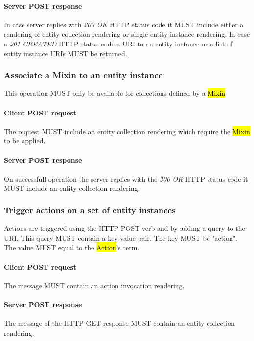 \documentclass[10pt,a4paper]{article}
\begin{document}
\paragraph{Server POST response}
In case server replies with \emph{200 OK} HTTP status code it MUST include either a rendering of entity collection rendering or single entity instance rendering. In case a \emph{201 CREATED} HTTP status code a URI to an entity instance or a list of entity instance URIs MUST be returned.

\subsubsection{Associate a Mixin to an entity instance}
This operation MUST only be available for collections defined by a \hl{Mixin}

\paragraph{Client POST request}
The request MUST include an entity collection rendering which require the \hl{Mixin} to be applied.

\paragraph{Server POST response}
On successfull operation the server replies with the \emph{200 OK} HTTP status code it MUST include an entity collection rendering.

\subsubsection{Trigger actions on a set of entity instances}
Actions are triggered using the HTTP POST verb and by adding a query to the URI. This query MUST contain a key-value pair. The key MUST be "action". The value MUST equal to the \hl{Action}'s term.

\paragraph{Client POST request}
The message MUST contain an action invocation rendering.

\paragraph{Server POST response}
The message of the HTTP GET response MUST contain an entity collection rendering.
\end{document}
